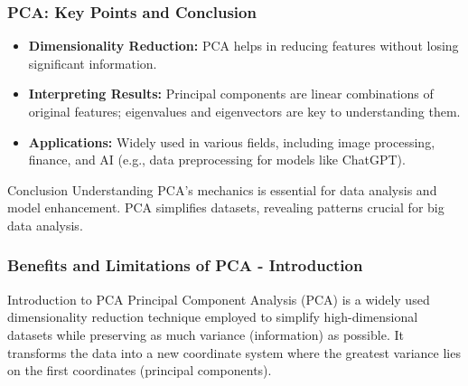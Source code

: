 \documentclass[aspectratio=169]{beamer}
\begin{document}
\begin{frame}[fragile]
    \frametitle{PCA: Key Points and Conclusion}
    \begin{itemize}
        \item \textbf{Dimensionality Reduction:} PCA helps in reducing features without losing significant information.
        \item \textbf{Interpreting Results:} Principal components are linear combinations of original features; eigenvalues and eigenvectors are key to understanding them.
        \item \textbf{Applications:} Widely used in various fields, including image processing, finance, and AI (e.g., data preprocessing for models like ChatGPT).
    \end{itemize}

    \begin{block}{Conclusion}
        Understanding PCA's mechanics is essential for data analysis and model enhancement. PCA simplifies datasets, revealing patterns crucial for big data analysis.
    \end{block}
\end{frame}

\begin{frame}[fragile]
    \frametitle{Benefits and Limitations of PCA - Introduction}
    \begin{block}{Introduction to PCA}
        Principal Component Analysis (PCA) is a widely used dimensionality reduction technique employed to simplify high-dimensional datasets while preserving as much variance (information) as possible. It transforms the data into a new coordinate system where the greatest variance lies on the first coordinates (principal components).
    \end{block}
\end{frame}
\end{document}
